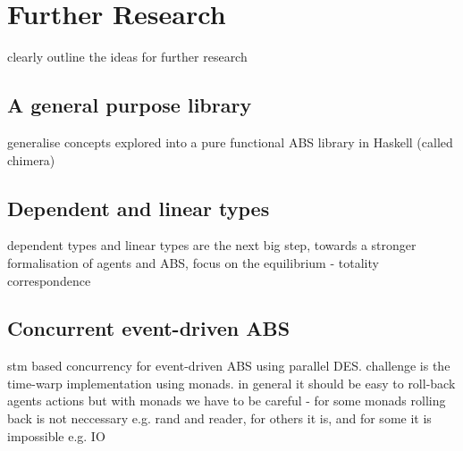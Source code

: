 \section{Further Research}
clearly outline the ideas for further research

\subsection{A general purpose library}
generalise concepts explored into a pure functional ABS library in Haskell (called chimera)

\subsection{Dependent and linear types}
dependent types and linear types are the next big step, towards a stronger formalisation of agents and ABS,
focus on the equilibrium - totality correspondence

\subsection{Concurrent event-driven ABS}
stm based concurrency for event-driven ABS using parallel DES. challenge is the time-warp implementation using monads. in general it should be easy to roll-back agents actions but with monads we have to be careful - for some monads rolling back is not neccessary e.g. rand and reader, for others it is, and for some it is impossible e.g. IO